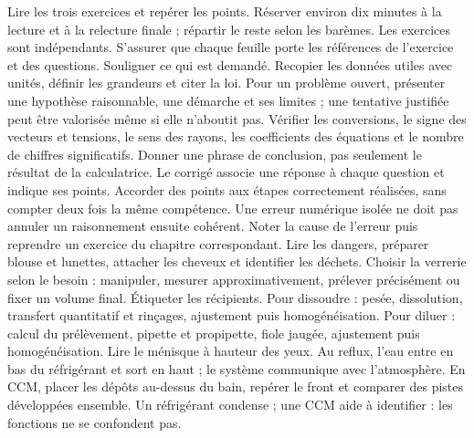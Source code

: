 Lire les trois exercices et repérer les points. Réserver environ dix minutes à la lecture et à la relecture finale ; répartir le reste selon les barèmes. Les exercices sont indépendants. S'assurer que chaque feuille porte les références de l'exercice et des questions.
Souligner ce qui est demandé. Recopier les données utiles avec unités, définir les grandeurs et citer la loi. Pour un problème ouvert, présenter une hypothèse raisonnable, une démarche et ses limites ; une tentative justifiée peut être valorisée même si elle n'aboutit pas.
Vérifier les conversions, le signe des vecteurs et tensions, le sens des rayons, les coefficients des équations et le nombre de chiffres significatifs. Donner une phrase de conclusion, pas seulement le résultat de la calculatrice.
Le corrigé associe une réponse à chaque question et indique ses points. Accorder des points aux étapes correctement réalisées, sans compter deux fois la même compétence. Une erreur numérique isolée ne doit pas annuler un raisonnement ensuite cohérent. Noter la cause de l'erreur puis reprendre un exercice du chapitre correspondant.
Lire les dangers, préparer blouse et lunettes, attacher les cheveux et identifier les déchets. Choisir la verrerie selon le besoin : manipuler, mesurer approximativement, prélever précisément ou fixer un volume final. Étiqueter les récipients.
Pour dissoudre : pesée, dissolution, transfert quantitatif et rinçages, ajustement puis homogénéisation. Pour diluer : calcul du prélèvement, pipette et propipette, fiole jaugée, ajustement puis homogénéisation. Lire le ménisque à hauteur des yeux.
Au reflux, l'eau entre en bas du réfrigérant et sort en haut ; le système communique avec l'atmosphère. En CCM, placer les dépôts au-dessus du bain, repérer le front et comparer des pistes développées ensemble. Un réfrigérant condense ; une CCM aide à identifier : les fonctions ne se confondent pas.
